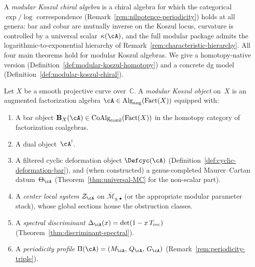A \emph{modular Koszul chiral algebra} is a chiral algebra for
which the categorical $\exp/\log$ correspondence
(Remark~\ref{rem:nilpotence-periodicity}) holds at all genera:
bar and cobar are mutually inverse on the Koszul locus,
curvature is controlled by a universal scalar~$\kappa(\cA)$, and the full
modular package admits the logarithmic-to-exponential hierarchy of
Remark~\ref{rem:characteristic-hierarchy}.  All four main theorems hold
for modular Koszul algebras.  We give a homotopy-native version
(Definition~\ref{def:modular-koszul-homotopy}) and a concrete dg model
(Definition~\ref{def:modular-koszul-chiral}).

\begin{definition}\label{def:modular-koszul-homotopy}
Let $X$ be a smooth projective curve over~$\mathbb{C}$.
A \emph{modular Koszul object} on~$X$ is an augmented factorization algebra
$\cA \in \operatorname{Alg}_{\mathrm{aug}}(\operatorname{Fact}(X))$
equipped with:
\begin{enumerate}[label=\textup{(D\arabic*$_\infty$)}]
\item\label{D:bar-htpy}
A bar object
$\mathbf{B}_X(\cA) \in \operatorname{CoAlg}_{\mathrm{conil}}(\operatorname{Fact}(X))$
in the homotopy category of factorization coalgebras.

\item\label{D:dual-htpy}
A dual object~$\cA^!$.

\item\label{D:deformation-htpy}
A filtered cyclic deformation object
$\Defcyc(\cA)$
(Definition~\ref{def:cyclic-deformation-bar}),
and (when constructed)
a genus-completed Maurer--Cartan datum~$\Theta_{\cA}$
\textup{(}Theorem~\textup{\ref{thm:universal-MC}} for the
non-scalar part\textup{)}.

\item\label{D:center-htpy}
A \emph{center local system}
$\mathcal{Z}_{\cA}$ on $\overline{\mathcal{M}}_{g,\bullet}$
\textup{(}or the appropriate modular parameter stack\textup{)},
whose global sections house the obstruction classes.

\item\label{D:discriminant-htpy}
A \emph{spectral discriminant}
$\Delta_{\cA}(x) = \det(1 - x\, T_{\mathrm{rec}})$
\textup{(}Theorem~\textup{\ref{thm:discriminant-spectral})}.

\item\label{D:periodicity-htpy}
A \emph{periodicity profile}
$\Pi(\cA) = (M_{\cA},\, Q_{\cA},\, G_{\cA})$
\textup{(}Remark~\textup{\ref{rem:periodicity-triple})}.
\end{enumerate}


\end{definition}
